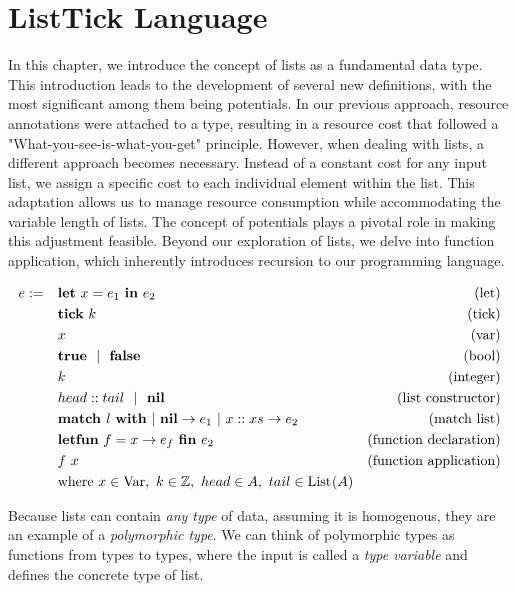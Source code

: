\chapter{ListTick Language}\label{chap:list-tick}

In this chapter, we introduce the concept of lists as a fundamental data type. This introduction leads to the development of several new definitions, with the most significant among them being potentials. In our previous approach, resource annotations were attached to a type, resulting in a resource cost that followed a "What-you-see-is-what-you-get" principle. However, when dealing with lists, a different approach becomes necessary. Instead of a constant cost for any input list, we assign a specific cost to each individual element within the list. This adaptation allows us to manage resource consumption while accommodating the variable length of lists. The concept of potentials plays a pivotal role in making this adjustment feasible. Beyond our exploration of lists, we delve into function application, which inherently introduces recursion to our programming language. 

\begin{definition}
   \label{def:prog-lang-6}

\begin{align*}
   e := ~~~ & \mathbf{let}~x = e_1~\mathbf{in}~e_2		& \text{(let)}\\
            & \mathbf{tick}~k				& \text{(tick)}\\
	    & x					& \text{(var)}\\
	    & \mathbf{true} ~~| ~~\mathbf{false}		& \text{(bool)}\\
	    & k					& \text{(integer)}\\
            & head :: tail ~~| ~~ \textbf{nil} & \text{(list constructor)}\\
            & \textbf{match } l~\textbf{with}~|~\textbf{nil} \to e_1~|~x :: xs \to e_2           & \text{(match list)}\\
            & \textbf{letfun}~f = x \to e_f~\textbf{fin}~e_2           & \text{(function declaration)} \\
            & f~x                               & \text{(function application)}\\
            & \text{where } x \in \text{Var},~k \in \mathbb{Z},~ head \in A,~ tail \in \text{List}^{}(A)
\end{align*}
\end{definition}

Because lists can contain \emph{any type} of data, assuming it is homogenous, they are an example of a \emph{polymorphic type}. We can think of polymorphic types as functions from types to types, where the input is called a \emph{type variable} and defines the concrete type of list. 


